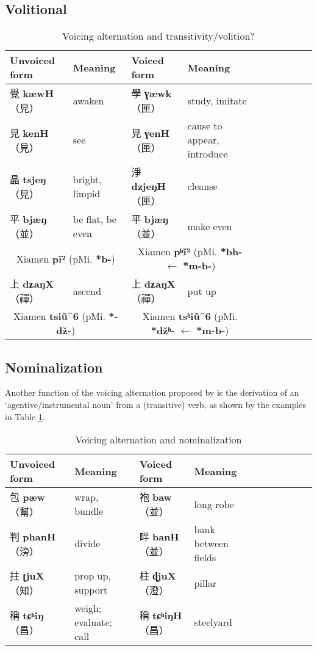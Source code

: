 \documentclass[oneside,a4paper,11pt]{article}
\newcommand{\ipa}[1]{\textbf{{\phon\mbox{#1}}}} %
\newcommand{\zh}[1]{{\cn #1}}
\newcommand{\zhc}[2]{\zh{#1} \ipa{#2}}
\newcommand{\mc}[1]{\zh{（#1）}}
\begin{document}
\subsection{Volitional}
\citet[55;131-5]{bs14oc}
\begin{table}[H]
\caption{Voicing alternation and transitivity/volition?}
\begin{tabular}{llllllllll}
\toprule
Unvoiced form &Meaning & Voiced form & Meaning\\
\midrule
\zhc{覺}{kæwH} \mc{見}	&awaken & \zhc{學}{ɣæwk} \mc{匣} & study, imitate \\
\zhc{見}{kenH} \mc{見}	&see & \zhc{見}{ɣenH} \mc{匣} & cause to appear, introduce \\
\zhc{晶}{tsjeŋ} \mc{見}	&bright, limpid & \zhc{淨}{dzjeŋH} \mc{匣} & cleanse\\
\zhc{平}{bjæŋ} \mc{並}	&be flat, be even & \zhc{平}{bjæŋ} \mc{並}	 & make even \\
\multicolumn{2}{c}{Xiamen \ipa{pĩ²} (pMi. \ipa{*b-})} & \multicolumn{2}{c}{Xiamen  \ipa{pʰĩ²}  (pMi. \ipa{*bh-} $\leftarrow$ \ipa{*m-b-})} \\
\zhc{上}{dʑaŋX} \mc{禪}	&ascend & \zhc{上}{dʑaŋX} \mc{禪}	 & put up \\
\multicolumn{2}{c}{Xiamen \ipa{tsiũ^6}  (pMi. \ipa{*-dž-})} & \multicolumn{2}{c}{Xiamen  \ipa{tsʰiũ^6}  (pMi. \ipa{*džʰ-} $\leftarrow$ \ipa{*m-b-})} \\
\bottomrule
\end{tabular}
\end{table}

\citet[282-4]{wangyt14jingdian}
\subsection{Nominalization}
Another function of the voicing alternation proposed by \citet[55]{bs14oc} is the derivation of an `agentive/instrumental noun' from a (transitive) verb, as shown by the examples in Table \ref{tab:nmlz.voicing.oc}.


\begin{table}[H]
\caption{Voicing alternation and nominalization} \label{tab:nmlz.voicing.oc}
\begin{tabular}{llllllllll}
\toprule
Unvoiced form &Meaning & Voiced form & Meaning\\
\midrule
\zhc{包}{pæw} \mc{幫}	&wrap, bundle & \zhc{袍}{baw} \mc{並} & long robe \\
\zhc{判}{phanH} \mc{滂}	&divide & \zhc{畔}{banH} \mc{並} & bank between fields \\
\zhc{拄}{ʈjuX} \mc{知}	&prop up, support  & \zhc{柱}{ɖjuX} \mc{澄} & pillar \\
\zhc{稱}{tɕʰiŋ} \mc{昌}	&weigh; evaluate; call & \zhc{稱}{tɕʰiŋH} \mc{昌} & steelyard \\
\bottomrule
\end{tabular}
\end{table}
\end{document}
